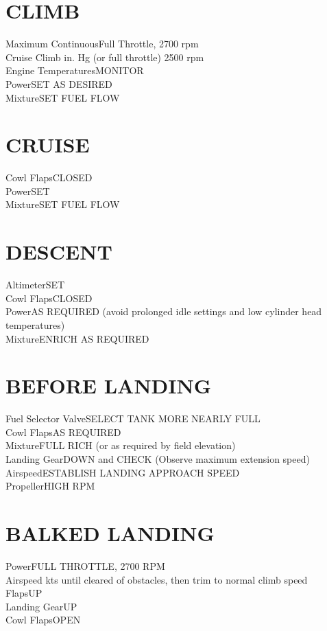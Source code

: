 \documentclass{article}
\begin{document}
\begin{multicols*}{2}
\section*{CLIMB}
Maximum Continuous\dotfill Full Throttle, 2700 rpm\\
Cruise Climb in. Hg (or full throttle) 2500 rpm\\
Engine Temperatures\dotfill MONITOR\\
Power\dotfill SET AS DESIRED\\
Mixture\dotfill SET FUEL FLOW
\section*{CRUISE}
Cowl Flaps\dotfill CLOSED\\
Power\dotfill SET\\
Mixture\dotfill SET FUEL FLOW
\section*{DESCENT}
Altimeter\dotfill SET\\
Cowl Flaps\dotfill CLOSED\\
Power\dotfill AS REQUIRED (avoid prolonged idle settings and low cylinder head temperatures)\\
Mixture\dotfill ENRICH AS REQUIRED
\section*{BEFORE LANDING}
Fuel Selector Valve\dotfill SELECT TANK MORE NEARLY FULL\\
Cowl Flaps\dotfill AS REQUIRED\\
Mixture\dotfill FULL RICH (or as required by field elevation)\\
Landing Gear\dotfill DOWN and CHECK (Observe maximum extension speed)\\
Airspeed\dotfill ESTABLISH LANDING APPROACH SPEED\\
Propeller\dotfill HIGH RPM
\section*{BALKED LANDING}
Power\dotfill FULL THROTTLE, 2700 RPM\\
Airspeed kts until cleared of obstacles, then trim to normal climb speed\\
Flaps\dotfill UP\\
Landing Gear\dotfill UP\\
Cowl Flaps\dotfill OPEN

\end{multicols*}
\end{document}
